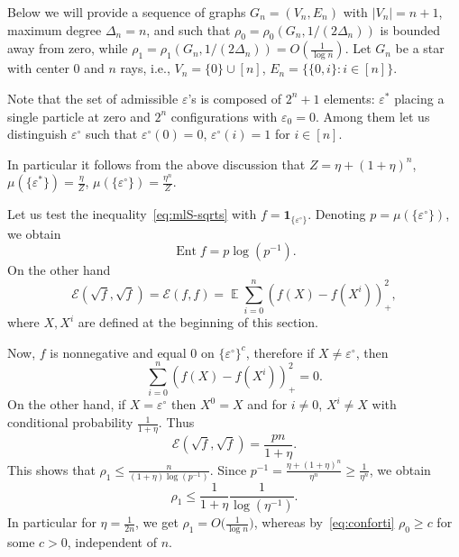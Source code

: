 \documentclass[a4paper]{amsart}
\theoremstyle{definition}
\theoremstyle{remark}
\numberwithin{equation}{section}
\DeclareMathOperator{\EE}{\mathbb{E}} %
\newcommand*{\calE}{\mathcal{E}}
\DeclareMathOperator{\Ent}{Ent}	%
\newcommand*{\ind}[1]{\mathbf{1}_{#1}}
\begin{document}
Below we will provide a sequence of graphs $G_n = (V_n,E_n)$ with $|V_n| = n+1$,  maximum degree $\Delta_n = n$, and such that $\rho_0 = \rho_0(G_n,1/(2\Delta_n))$ is bounded away from zero, while $\rho_1 = \rho_1(G_n,1/(2\Delta_n)) = O(\frac{1}{\log n})$.
Let $G_n$ be a star with center $0$ and $n$ rays, i.e., $V_n = \{0\}\cup[n]$, $E_n = \{\{0,i\}\colon i \in [n]\}$.

Note that the set of  admissible $\varepsilon$'s is composed of $2^n + 1$ elements:  $\varepsilon^\ast$ placing a single particle at zero and $2^n$ configurations with $\varepsilon_0 = 0$. Among them let us distinguish $\varepsilon^\circ$ such that $\varepsilon^\circ(0) = 0$, $\varepsilon^\circ(i) = 1$ for $i \in [n]$.

In particular it follows from the above discussion that $Z = \eta + (1+\eta)^n$, $\mu(\{\varepsilon^\ast\}) = \frac{\eta}{Z}$, $\mu(\{\varepsilon^\circ\}) = \frac{\eta^n}{Z}$.

Let us test the inequality~\eqref{eq:mlS-sqrts} with  $f= \ind{\{\varepsilon^\circ\}}$. Denoting $p = \mu(\{\varepsilon^\circ\})$, we obtain
\begin{displaymath}
  \Ent f = p\log(p^{-1}).
\end{displaymath}
On the other hand
\begin{displaymath}
  \calE(\sqrt{f},\sqrt{f}) = \calE(f,f) = \EE \sum_{i=0}^n (f(X) - f(X^i))_+^2,
\end{displaymath}
where $X,X^i$ are defined at the beginning of this section.

Now, $f$ is nonnegative and equal $0$ on $\{\varepsilon^\circ\}^c$, therefore if $X \neq \varepsilon^\circ$, then
\begin{displaymath}
\sum_{i=0}^n (f(X) - f(X^i))_+^2=0.
\end{displaymath}
On the other hand, if $X = \varepsilon^\circ$ then
$X^0 = X$ and for $i\neq 0$, $X^i \neq X$ with conditional probability $\frac{1}{1+\eta}$. Thus
\begin{displaymath}
\calE(\sqrt{f},\sqrt{f}) = \frac{pn}{1+\eta}.
\end{displaymath}
This shows that $\rho_1 \le \frac{n}{(1+\eta)\log(p^{-1})}$. Since $p^{-1} = \frac{\eta+(1+\eta)^n}{\eta^n}  \ge \frac{1}{\eta^{n}}$, we obtain
\begin{displaymath}
  \rho_1 \le \frac{1}{1+\eta} \frac{1}{\log(\eta^{-1})}.
\end{displaymath}
In particular for $\eta = \frac{1}{2n}$, we get $\rho_1 = O\Big(\frac{1}{\log n}\Big)$, whereas by~\eqref{eq:conforti} $\rho_0 \ge c$ for some  $c>0$, independent of $n$.
\end{document}
